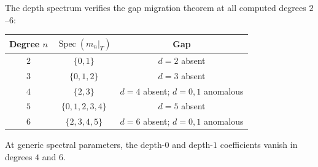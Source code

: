 \begin{computation}
The depth spectrum verifies the gap migration theorem
at all computed degrees $2$--$6$:
\begin{center}
\small
\renewcommand{\arraystretch}{1.15}
\begin{tabular}{@{}ccc@{}}
\textbf{Degree $n$} & $\operatorname{Spec}(m_n|_T)$
 & \textbf{Gap} \\
\hline
$2$ & $\{0, 1\}$ & $d = 2$ absent \\
$3$ & $\{0, 1, 2\}$ & $d = 3$ absent \\
$4$ & $\{2, 3\}$ & $d = 4$ absent; $d=0,1$ anomalous \\
$5$ & $\{0, 1, 2, 3, 4\}$ & $d = 5$ absent \\
$6$ & $\{2, 3, 4, 5\}$ & $d = 6$ absent; $d=0,1$ anomalous
\end{tabular}
\end{center}
At generic spectral parameters, the depth-$0$ and depth-$1$
coefficients vanish in degrees $4$ and $6$.
\end{computation}

